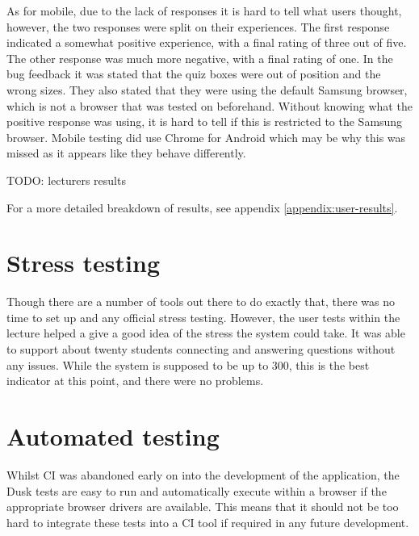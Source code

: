 As for mobile, due to the lack of responses it is hard to tell what users thought, however, the two responses were split on their experiences. The first response indicated a somewhat positive experience, with a final rating of three out of five. The other response was much more negative, with a final rating of one. In the bug feedback it was stated that the quiz boxes were out of position and the wrong sizes. They also stated that they were using the default Samsung browser, which is not a browser that was tested on beforehand. Without knowing what the positive response was using, it is hard to tell if this is restricted to the Samsung browser. Mobile testing did use Chrome for Android which may be why this was missed as it appears like they behave differently.

TODO: lecturers results

For a more detailed breakdown of results, see appendix \ref{appendix:user-results}.

\section{Stress testing}
Though there are a number of tools out there to do exactly that, there was no time to set up and any official stress testing. However, the user tests within the lecture helped a give a good idea of the stress the system could take. It was able to support about twenty students connecting and answering questions without any issues. While the system is supposed to be up to 300, this is the best indicator at this point, and there were no problems.

\section{Automated testing}
Whilst CI was abandoned early on into the development of the application, the Dusk tests are easy to run and automatically execute within a browser if the appropriate browser drivers are available. This means that it should not be too hard to integrate these tests into a CI tool if required in any future development.